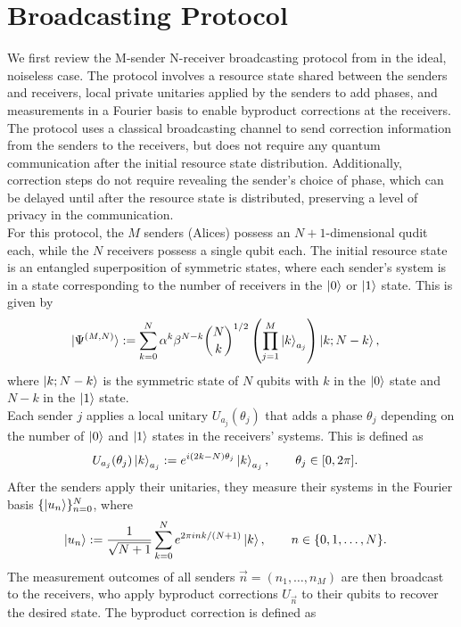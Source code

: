 \section{Broadcasting Protocol}
We first review the M-sender N-receiver broadcasting protocol from \cite{sukeno2023broadcasting} in the ideal, noiseless case. The protocol involves a resource state shared between the senders and receivers, local private unitaries applied by the senders to add phases, and measurements in a Fourier basis to enable byproduct corrections at the receivers. The protocol uses a classical broadcasting channel to send correction information from the senders to the receivers, but does not require any quantum communication after the initial resource state distribution. Additionally, correction steps do not require revealing the sender's choice of phase, which can be delayed until after the resource state is distributed, preserving a level of privacy in the communication.
\\
For this protocol, the $M$ senders (Alices) possess an $N+1$-dimensional qudit each, while the $N$ receivers possess a single qubit each. The initial resource state is an entangled superposition of symmetric states, where each sender's system is in a state corresponding to the number of receivers in the $\ket{0}$ or $\ket{1}$ state. This is given by
\begin{align}
\ket{\Psi^{(M,N)}}
&:= \sum_{k=0}^{N}\alpha^k\beta^{N-k}\binom{N}{k}^{1/2}
\left(\prod_{j=1}^{M}\ket{k}_{a_j}\right)\ket{k;N-k},
\end{align}
where $\ket{k;N-k}$ is the symmetric state of $N$ qubits with $k$ in the $\ket{0}$ state and $N-k$ in the $\ket{1}$ state.
\\
Each sender $j$ applies a local unitary $U_{a_j}(\theta_j)$ that adds a phase $\theta_j$ depending on the number of $\ket{0}$ and $\ket{1}$ states in the receivers' systems. This is defined as
\begin{align}
U_{a_j}(\theta_j)\ket{k}_{a_j}
&:= e^{i(2k-N)\theta_j}\ket{k}_{a_j},
\qquad \theta_j\in[0, 2\pi].
\end{align}
After the senders apply their unitaries, they measure their systems in the Fourier basis $\{\ket{u_n}\}_{n=0}^N$, where
\begin{align}
\ket{u_n}
&:= \frac{1}{\sqrt{N+1}}\sum_{k=0}^{N} e^{2\pi i nk/(N+1)}\ket{k},
\qquad n\in\{0,1,\dots,N\}.
\end{align}
The measurement outcomes of all senders $\Vec{n}=(n_1,\dots,n_M)$ are then broadcast to the receivers, who apply byproduct corrections $U_{\Vec{n}}$ to their qubits to recover the desired state. The byproduct correction is defined as
